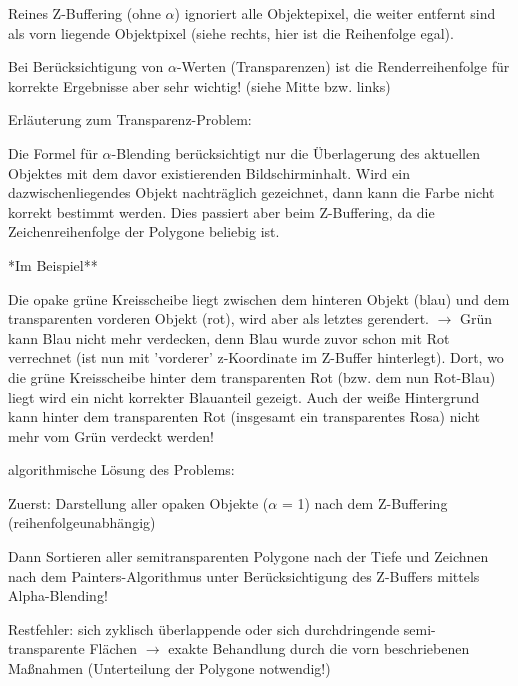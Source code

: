 \documentclass[landscape]{article}
\begin{document}
\begin{multicols}{3}
  
  \begin{itemize*}
    \item Reines Z-Buffering (ohne $\alpha$) ignoriert alle Objektepixel, die weiter entfernt sind als vorn liegende Objektpixel (siehe rechts, hier ist die Reihenfolge egal).
    \item Bei Berücksichtigung von $\alpha$-Werten (Transparenzen) ist die Renderreihenfolge für korrekte Ergebnisse aber sehr wichtig! (siehe Mitte bzw. links)
    \item Erläuterung zum Transparenz-Problem:
    \item Die Formel für $\alpha$-Blending berücksichtigt nur die Überlagerung des aktuellen Objektes mit dem davor existierenden Bildschirminhalt. Wird ein dazwischenliegendes Objekt nachträglich gezeichnet, dann kann die Farbe nicht korrekt bestimmt werden. Dies passiert aber beim Z-Buffering, da die Zeichenreihenfolge der Polygone beliebig ist.
    \item **Im Beispiel**
    \item Die opake grüne Kreisscheibe liegt zwischen dem hinteren Objekt (blau) und dem transparenten vorderen Objekt (rot), wird aber als letztes gerendert. $\rightarrow$ Grün kann Blau nicht mehr verdecken, denn Blau wurde zuvor schon mit Rot verrechnet (ist nun mit 'vorderer' z-Koordinate im Z-Buffer hinterlegt). Dort, wo die grüne Kreisscheibe hinter dem transparenten Rot (bzw. dem nun Rot-Blau) liegt wird ein nicht korrekter Blauanteil gezeigt. Auch der weiße Hintergrund kann hinter dem transparenten Rot (insgesamt ein transparentes Rosa) nicht mehr vom Grün verdeckt werden!
    \item algorithmische Lösung des Problems:
    \item Zuerst: Darstellung aller opaken Objekte ($\alpha$ = 1) nach dem Z-Buffering (reihenfolgeunabhängig)
    \item Dann Sortieren aller semitransparenten Polygone nach der Tiefe und Zeichnen nach dem Painters-Algorithmus unter Berücksichtigung des Z-Buffers mittels Alpha-Blending!
    \item Restfehler: sich zyklisch überlappende oder sich durchdringende semi-transparente Flächen $\rightarrow$ exakte Behandlung durch die vorn beschriebenen Maßnahmen (Unterteilung der Polygone notwendig!)
  \end{itemize*}
  
  \newpage

\end{multicols}
\end{document}
